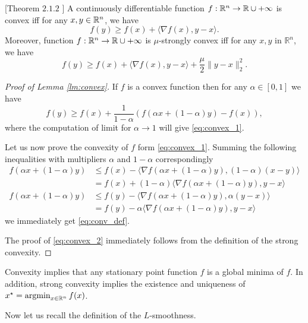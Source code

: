 \begin{lemma}\label{lm:convex}[Theorem $2.1.2$ \cite{nesterov-book}]
    A continuously differentiable function $f:\mathbb{R}^n\rightarrow \mathbb{R}\cup{+\infty}$ is convex iff for any $x,y\in\mathbb{R}^n$, we have
    \begin{equation}\label{eq:convex_1}
        f(y) \geq f(x) + \langle \nabla f(x), y-x\rangle.
    \end{equation}
    Moreover, function $f:\mathbb{R}^n\rightarrow \mathbb{R}\cup{+\infty}$ is $\mu$-strongly convex iff for any $x,y$ in $\mathbb{R}^n$, we have
    \begin{equation}\label{eq:convex_2}
        f(y) \geq f(x) + \langle \nabla f(x), y-x\rangle + \frac{\mu}{2}\|y-x\|_2^2.
    \end{equation}
\end{lemma}
\begin{proof}[Proof of Lemma \ref{lm:convex}]
If $f$ is a convex function then for any $\alpha\in[0,1]$ we have 
$$
f(y)\geq f(x) +\frac{1}{1-\alpha}\left(f(\alpha x + (1-\alpha)y) - f(x)\right),
$$
where the computation of limit for $\alpha \rightarrow 1$ will give \eqref{eq:convex_1}.

Let us now prove the convexity of $f$ form \eqref{eq:convex_1}.
Summing the following inequalities with multipliers $\alpha$ and $1-\alpha$ correspondingly
\begin{align*}
f(\alpha x + (1-\alpha)y) &\leq f(x) - \langle \nabla f(\alpha x + (1-\alpha)y), (1-\alpha)(x-y)\rangle\\
&= f(x) + (1-\alpha) \langle \nabla f(\alpha x + (1-\alpha)y), y-x\rangle\\
f(\alpha x + (1-\alpha)y)&\leq f(y) - \langle \nabla f(\alpha x + (1-\alpha)y), \alpha(y-x)\rangle\\&= f(y) - \alpha \langle \nabla f(\alpha x + (1-\alpha)y), y-x\rangle
\end{align*}
we immediately get \eqref{eq:conv_def}. 

The proof of \eqref{eq:convex_2} immediately follows from the definition of the strong convexity.
\end{proof}

Convexity implies that any stationary point function $f$ is a global minima of $f$. In addition, strong convexity implies the existence and uniqueness of $x^\star = \operatorname*{argmin}_{x\in\mathbb{R}^n} f(x)$.

Now let us recall the definition of the $L$-smoothness. 

